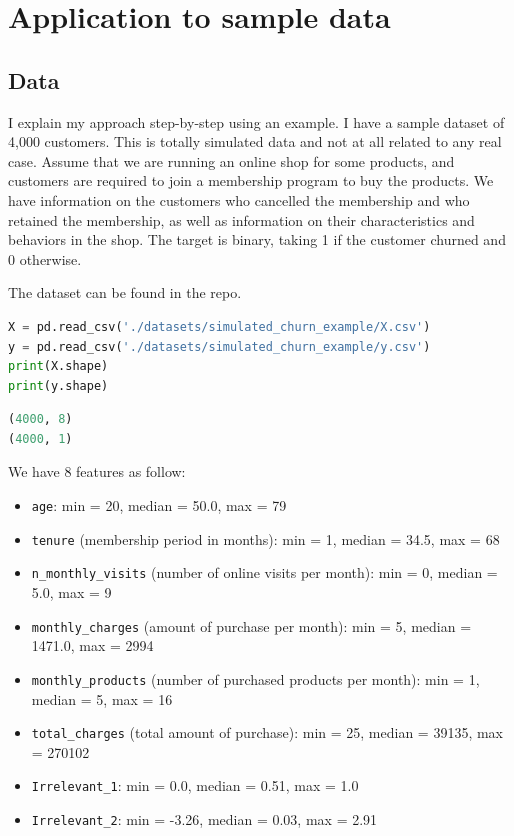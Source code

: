 \documentclass{article}
\begin{document}
\section{Application to sample data}
\subsection{Data}
I explain my approach step-by-step using an example. I have a sample dataset of 4,000 customers. This is totally simulated data and not at all related to any real case. Assume that we are running an online shop for some products, and customers are required to join a membership program to buy the products. We have information on the customers who cancelled the membership and who retained the membership, as well as information on their characteristics and behaviors in the shop. The target is binary, taking 1 if the customer churned and 0 otherwise. 

The dataset can be found in the repo.

\begin{lstlisting}[language=Python]
X = pd.read_csv('./datasets/simulated_churn_example/X.csv')
y = pd.read_csv('./datasets/simulated_churn_example/y.csv')
print(X.shape)
print(y.shape)
\end{lstlisting}

\begin{lstlisting}[language=Python,numbers=none]
(4000, 8)
(4000, 1)
\end{lstlisting}

We have 8 features as follow:
\begin{itemize}
  \item \verb|age|: min = 20, median = 50.0, max = 79
  \item \verb|tenure| (membership period in months): min = 1, median = 34.5, max = 68
  \item \verb|n_monthly_visits| (number of online visits per month): min = 0, median = 5.0, max = 9
  \item \verb|monthly_charges| (amount of purchase per month): min = 5, median = 1471.0, max = 2994
  \item \verb|monthly_products| (number of purchased products per month): min = 1, median = 5, max = 16
  \item \verb|total_charges| (total amount of purchase): min = 25, median = 39135, max = 270102
  \item \verb|Irrelevant_1|: min = 0.0, median = 0.51, max = 1.0
  \item \verb|Irrelevant_2|: min = -3.26, median = 0.03, max = 2.91
\end{itemize}
\end{document}
